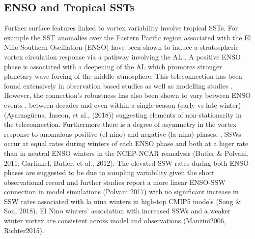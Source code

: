 \subsection{ENSO and Tropical SSTs}
Further surface features linked to vortex variability involve tropical SSTs. For example the SST anomalies over the Eastern Pacific region associated with the El Ni\~{n}o Southern Oscillation (ENSO) have been shown to induce a stratospheric vortex circulation response via a pathway involving the AL \citep{Domeison2019}. A positive ENSO phase is associated with a deepening of the AL which promotes stronger planetary wave forcing of the middle atmosphere. This teleconnection has been found extensively in observation based studies \citep{Garfinkel2008, Ineson2009, Smith2012}  as well as modelling studies \citep{Bell2009, Domeison2015, Manzini2006, Richter2015}. However, the connection's robustness has also been shown to vary between ENSO events \citep{deser2017, Iza2016}, between decades \citep{ayarzaguena2018} and even within a single season (early vs late winter) (Ayarzagüena, Inseon, et al., (2018)) suggesting elements of non-stationarity in the teleconnection. Furthermore there is a degree of asymmetry in the vortex response to anomalous positive (el nino) and negative (la nina) phases, ; SSWs occur at equal rates during winters of each ENSO phase and both at a higer rate than in neutral ENSO winters in the NCEP-NCAR reanalysis (Butler & Polvani, 2011; Garfinkel, Butler, et al., 2012). The elevated SSW rates during both ENSO phases are suggested to be due to sampling variability given the short observational record and further studies report a more linear ENSO-SSW connection in model simulations (Polvani 2017) with no significant increase in SSW rates associated with la nina winters in high-top CMIP5 models (Song & Son, 2018). El Nino winters' association with increased SSWs and a weaker winter vortex are consistent across model and observations (Manzini2006, Richter2015). 

